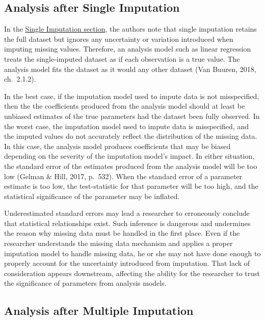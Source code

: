 \documentclass[12pt,oneside]{chicagocapstone}
\begin{document}
\subsection*{Analysis after Single
Imputation}\label{background-analysis-single}

In the \protect\hyperlink{background-single-imputation}{Single
Imputation section}, the authors note that single imputation retains the
full dataset but ignores any uncertainty or variation introduced when
imputing missing values. Therefore, an analysis model such as linear
regression treats the single-imputed dataset as if each observation is a
true value. The analysis model fits the dataset as it would any other
dataset (Van Buuren, 2018, ch.~2.1.2).

In the best case, if the imputation model used to impute data is not
misspecified, then the the coefficients produced from the analysis model
should at least be unbiased estimates of the true parameters had the
dataset been fully observed. In the worst case, the imputation model
used to impute data is misspecified, and the imputed values do not
accurately reflect the distribution of the missing data. In this case,
the analysis model produces coefficients that may be biased depending on
the severity of the imputation model's impact. In either situation, the
standard error of the estimates produced from the analysis model will be
too low (Gelman \& Hill, 2017, p.~532). When the standard error of a
parameter estimate is too low, the test-statistic for that parameter
will be too high, and the statistical significance of the parameter may
be inflated.

Underestimated standard errors may lead a researcher to erroneously
conclude that statistical relationships exist. Such inference is
dangerous and undermines the reason why missing data must be handled in
the first place. Even if the researcher understands the missing data
mechanism and applies a proper imputation model to handle missing data,
he or she may not have done enough to properly account for the
uncertainty introduced from imputation. That lack of consideration
appears downstream, affecting the ability for the researcher to trust
the significance of parameters from analysis models.

\subsection*{Analysis after Multiple
Imputation}\label{background-analysis-multiple}
\end{document}
